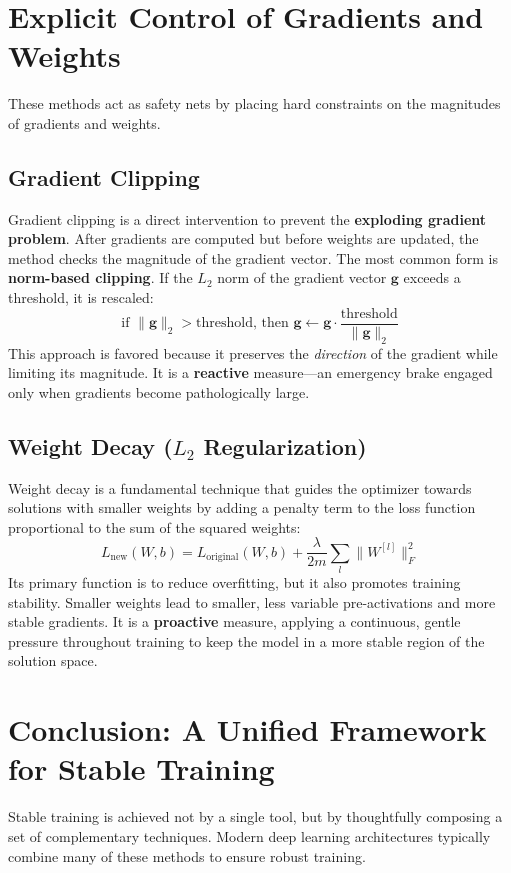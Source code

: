 \documentclass{article}
\begin{document}
\section{Explicit Control of Gradients and Weights}
These methods act as safety nets by placing hard constraints on the magnitudes of gradients and weights.

\subsection{Gradient Clipping}
Gradient clipping is a direct intervention to prevent the \textbf{exploding gradient problem}. After gradients are computed but before weights are updated, the method checks the magnitude of the gradient vector. The most common form is \textbf{norm-based clipping}. If the $L_2$ norm of the gradient vector $\mathbf{g}$ exceeds a threshold, it is rescaled:
\begin{equation}
\text{if } \|\mathbf{g}\|_2 > \text{threshold, then } \mathbf{g} \leftarrow \mathbf{g} \cdot \frac{\text{threshold}}{\|\mathbf{g}\|_2}
\end{equation}
This approach is favored because it preserves the \emph{direction} of the gradient while limiting its magnitude. It is a \textbf{reactive} measure---an emergency brake engaged only when gradients become pathologically large.

\subsection{Weight Decay ($L_2$ Regularization)}
Weight decay is a fundamental technique that guides the optimizer towards solutions with smaller weights by adding a penalty term to the loss function proportional to the sum of the squared weights:
\begin{equation}
L_{\text{new}}(W,b) = L_{\text{original}}(W,b) + \frac{\lambda}{2m} \sum_{l} \|W^{[l]}\|_F^2
\end{equation}
Its primary function is to reduce overfitting, but it also promotes training stability. Smaller weights lead to smaller, less variable pre-activations and more stable gradients. It is a \textbf{proactive} measure, applying a continuous, gentle pressure throughout training to keep the model in a more stable region of the solution space.

\section{Conclusion: A Unified Framework for Stable Training}
Stable training is achieved not by a single tool, but by thoughtfully composing a set of complementary techniques. Modern deep learning architectures typically combine many of these methods to ensure robust training.
\end{document}
